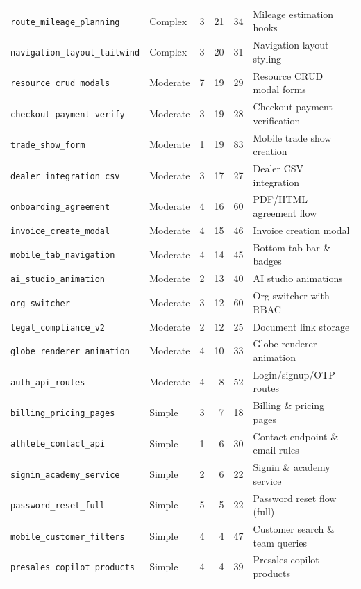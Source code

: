 \documentclass[11pt,letterpaper]{article}
\begin{document}
\begin{table}[H]
\begin{tabular}{llrrrl}
\texttt{route\_mileage\_planning}  & Complex  & 3 & 21 & 34  & Mileage estimation hooks \\
\texttt{navigation\_layout\_tailwind}& Complex& 3 & 20 & 31  & Navigation layout styling \\
\midrule
\texttt{resource\_crud\_modals}    & Moderate & 7 & 19 & 29  & Resource CRUD modal forms \\
\texttt{checkout\_payment\_verify} & Moderate & 3 & 19 & 28  & Checkout payment verification \\
\texttt{trade\_show\_form}         & Moderate & 1 & 19 & 83  & Mobile trade show creation \\
\texttt{dealer\_integration\_csv}  & Moderate & 3 & 17 & 27  & Dealer CSV integration \\
\texttt{onboarding\_agreement}     & Moderate & 4 & 16 & 60  & PDF/HTML agreement flow \\
\texttt{invoice\_create\_modal}    & Moderate & 4 & 15 & 46  & Invoice creation modal \\
\texttt{mobile\_tab\_navigation}   & Moderate & 4 & 14 & 45  & Bottom tab bar \& badges \\
\texttt{ai\_studio\_animation}     & Moderate & 2 & 13 & 40  & AI studio animations \\
\texttt{org\_switcher}             & Moderate & 3 & 12 & 60  & Org switcher with RBAC \\
\texttt{legal\_compliance\_v2}     & Moderate & 2 & 12 & 25  & Document link storage \\
\texttt{globe\_renderer\_animation}& Moderate & 4 & 10 & 33  & Globe renderer animation \\
\texttt{auth\_api\_routes}         & Moderate & 4 &  8 & 52  & Login/signup/OTP routes \\
\midrule
\texttt{billing\_pricing\_pages}   & Simple   & 3 &  7 & 18  & Billing \& pricing pages \\
\texttt{athlete\_contact\_api}     & Simple   & 1 &  6 & 30  & Contact endpoint \& email rules \\
\texttt{signin\_academy\_service}  & Simple   & 2 &  6 & 22  & Signin \& academy service \\
\texttt{password\_reset\_full}     & Simple   & 5 &  5 & 22  & Password reset flow (full) \\
\texttt{mobile\_customer\_filters} & Simple   & 4 &  4 & 47  & Customer search \& team queries \\
\texttt{presales\_copilot\_products}& Simple  & 4 &  4 & 39  & Presales copilot products \\

\end{tabular}
\end{table}
\end{document}
